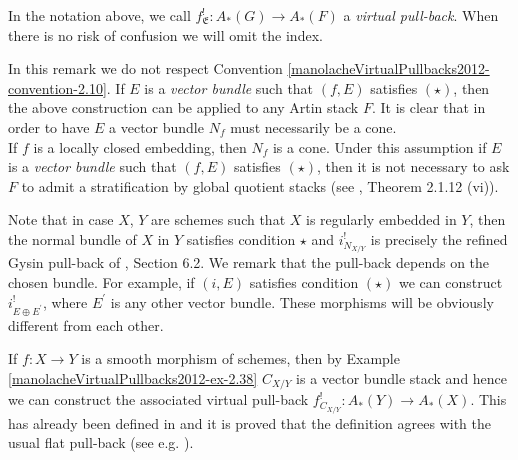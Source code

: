 \begin{definition}\label{manolacheVirtualPullbacks2012-def-3.7}
\label{manolacheVirtualPullbacks2012-vp}
In the notation above, we call $f_{\mathfrak{E}}^!: A_*(G)\to A_*(F)$ a \textit{virtual pull-back}. When there is no risk of confusion we will omit the index.
\end{definition}

\begin{remark}\label{manolacheVirtualPullbacks2012-rem-3.8}
In this remark we do not respect Convention \ref{manolacheVirtualPullbacks2012-convention-2.10}. If $E$ is a \emph{vector bundle} such that $(f,E)$ satisfies $(\star)$, then the above construction can be applied to any Artin stack $F$.  It is clear that in order to have $E$ a vector bundle $N_f$ must necessarily be a cone.
\\If $f$ is a locally closed embedding, then $N_f$ is a cone. Under this assumption if $E$ is a \emph{vector bundle} such that $(f,E)$ satisfies $(\star)$, then it is not necessary to ask $F$ to admit a stratification by global quotient stacks (see \cite{K:02}, Theorem 2.1.12 (vi)).
\end{remark}

\begin{remark}\label{manolacheVirtualPullbacks2012-rem-3.9}
Note that in case $X$, $Y$ are schemes such that $X$ is regularly embedded in $Y$, then the normal bundle of $X$ in $Y$ satisfies condition $\star$ and $i^!_{N_{X/Y}}$ is precisely the refined Gysin pull-back of \cite{f}, Section 6.2. We remark that the pull-back depends on the chosen bundle. For example, if $(i,E)$ satisfies condition $(\star)$ we can construct $i^!_{E\oplus E^{\prime}}$, where $E^{\prime}$ is any other vector bundle. These morphisms will be obviously different from each other.
\end{remark}

\begin{remark}\label{manolacheVirtualPullbacks2012-rem-3.10}
\label{manolacheVirtualPullbacks2012-fultflat}
 If $f:X\to Y$ is a smooth morphism of schemes, then by Example \ref{manolacheVirtualPullbacks2012-ex-2.38} $C_{X/Y}$ is a vector bundle stack and hence we can construct the  associated virtual pull-back $f^!_{C_{X/Y}}:A_*(Y)\to A_*(X)$. This has already been defined in \cite{K:03} and it is proved that the definition agrees with the usual flat pull-back (see e.g. \cite{f}).
\end{remark}

